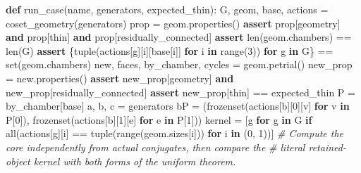 \documentclass[
  10pt,
  letterpaper,
]{article}
\newenvironment{Shaded}{}{}
\newcommand{\BuiltInTok}[1]{\textcolor[rgb]{0.00,0.50,0.00}{#1}}
\newcommand{\CommentTok}[1]{\textcolor[rgb]{0.38,0.63,0.69}{\textit{#1}}}
\newcommand{\ControlFlowTok}[1]{\textcolor[rgb]{0.00,0.44,0.13}{\textbf{#1}}}
\newcommand{\DecValTok}[1]{\textcolor[rgb]{0.25,0.63,0.44}{#1}}
\newcommand{\KeywordTok}[1]{\textcolor[rgb]{0.00,0.44,0.13}{\textbf{#1}}}
\newcommand{\NormalTok}[1]{#1}
\newcommand{\OperatorTok}[1]{\textcolor[rgb]{0.40,0.40,0.40}{#1}}
\newcommand{\StringTok}[1]{\textcolor[rgb]{0.25,0.44,0.63}{#1}}
\begin{document}
\begin{Shaded}
\begin{Highlighting}[]
\KeywordTok{def}\NormalTok{ run\_case(name, generators, expected\_thin):}
\NormalTok{    G, geom, base, actions }\OperatorTok{=}\NormalTok{ coset\_geometry(generators)}
\NormalTok{    prop }\OperatorTok{=}\NormalTok{ geom.properties()}
    \ControlFlowTok{assert}\NormalTok{ prop[}\StringTok{\textquotesingle{}geometry\textquotesingle{}}\NormalTok{] }\KeywordTok{and}\NormalTok{ prop[}\StringTok{\textquotesingle{}thin\textquotesingle{}}\NormalTok{] }\KeywordTok{and}\NormalTok{ prop[}\StringTok{\textquotesingle{}residually\_connected\textquotesingle{}}\NormalTok{]}
    \ControlFlowTok{assert} \BuiltInTok{len}\NormalTok{(geom.chambers) }\OperatorTok{==} \BuiltInTok{len}\NormalTok{(G)}
    \ControlFlowTok{assert}\NormalTok{ \{}\BuiltInTok{tuple}\NormalTok{(actions[g][i][base[i]] }\ControlFlowTok{for}\NormalTok{ i }\KeywordTok{in} \BuiltInTok{range}\NormalTok{(}\DecValTok{3}\NormalTok{)) }\ControlFlowTok{for}\NormalTok{ g }\KeywordTok{in}\NormalTok{ G\} }\OperatorTok{==} \BuiltInTok{set}\NormalTok{(geom.chambers)}
\NormalTok{    new, faces, by\_chamber, cycles }\OperatorTok{=}\NormalTok{ geom.petrial()}
\NormalTok{    new\_prop }\OperatorTok{=}\NormalTok{ new.properties()}
    \ControlFlowTok{assert}\NormalTok{ new\_prop[}\StringTok{\textquotesingle{}geometry\textquotesingle{}}\NormalTok{] }\KeywordTok{and}\NormalTok{ new\_prop[}\StringTok{\textquotesingle{}residually\_connected\textquotesingle{}}\NormalTok{]}
    \ControlFlowTok{assert}\NormalTok{ new\_prop[}\StringTok{\textquotesingle{}thin\textquotesingle{}}\NormalTok{] }\OperatorTok{==}\NormalTok{ expected\_thin}
\NormalTok{    P }\OperatorTok{=}\NormalTok{ by\_chamber[base]}
\NormalTok{    a, b, c }\OperatorTok{=}\NormalTok{ generators}
\NormalTok{    bP }\OperatorTok{=}\NormalTok{ (}\BuiltInTok{frozenset}\NormalTok{(actions[b][}\DecValTok{0}\NormalTok{][v] }\ControlFlowTok{for}\NormalTok{ v }\KeywordTok{in}\NormalTok{ P[}\DecValTok{0}\NormalTok{]), }\BuiltInTok{frozenset}\NormalTok{(actions[b][}\DecValTok{1}\NormalTok{][e] }\ControlFlowTok{for}\NormalTok{ e }\KeywordTok{in}\NormalTok{ P[}\DecValTok{1}\NormalTok{]))}
\NormalTok{    kernel }\OperatorTok{=}\NormalTok{ [g }\ControlFlowTok{for}\NormalTok{ g }\KeywordTok{in}\NormalTok{ G }\ControlFlowTok{if} \BuiltInTok{all}\NormalTok{(actions[g][i] }\OperatorTok{==} \BuiltInTok{tuple}\NormalTok{(}\BuiltInTok{range}\NormalTok{(geom.sizes[i])) }\ControlFlowTok{for}\NormalTok{ i }\KeywordTok{in}\NormalTok{ (}\DecValTok{0}\NormalTok{, }\DecValTok{1}\NormalTok{))]}
    \CommentTok{\# Compute the core independently from actual conjugates, then compare the}
    \CommentTok{\# literal retained{-}object kernel with both forms of the uniform theorem.}

\end{Highlighting}
\end{Shaded}
\end{document}
